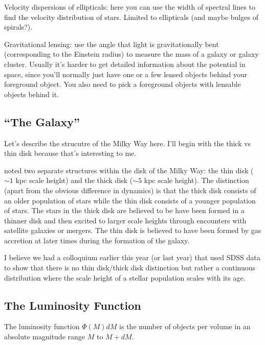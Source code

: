 \begin{enumerate}
      Velocity dispersions of ellipticals: here you can use the width of spectral lines to find the velocity distribution of stars. Limited to ellipticals (and maybe bulges of spirals?).
      
      Gravitational lensing: use the angle that light is gravitationally bent (corresponding to the Einstein radius) to measure the mass of a galaxy or galaxy cluster. Usually it's harder to get detailed information about the potential in space, since you'll normally just have one or a few lensed objects behind your foreground object. You also need to pick a foreground objects with lensable objects behind it.
      
\end{enumerate}

\subsection{``The Galaxy''}

Let's describe the strucutre of the Milky Way here.  I'll begin with the thick vs thin disk
because that's interesting to me.

 noted two separate structures within the disk of the
Milky Way: the thin disk ($\sim1$ kpc scale height) and the thick disk
($\sim5$ kpc scale height).  The distinction (apart from the obvious difference in dynamics)
is that the thick disk consists of an older population of stars while the thin disk consists
of a younger population of stars.
The stars in the thick disk are believed to be have been formed in a thinner disk and then
excited to larger scale heights through encounters with satellite galaxies or mergers.
The thin disk is believed to have been formed by gas
accretion at later times during the formation of the galaxy.

I believe we had a colloquium earlier this year (or last year) that used SDSS data to show
that there is no thin disk/thick disk distinction but rather a continuous distribution
where the scale height of a stellar population scales with its age.

\subsection{The Luminosity Function}

The luminosity function $\Phi(M)dM$ is the number of objects per volume in an absolute magnitude range $M$ to $M+dM$. 


